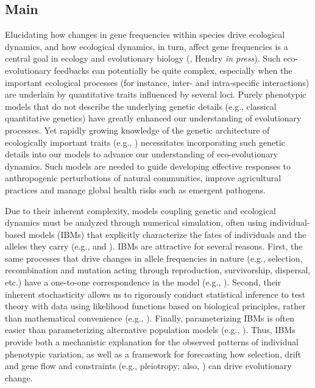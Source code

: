\documentclass[1p,numbered]{article}
\begin{document}
\begin{linenumbers}
\pagestyle{plain}



\renewcommand\linenumberfont{\normalfont\small}

\setlength\linenumbersep{1cm}
\section*{Main}
Elucidating how changes in gene frequencies within species drive ecological dynamics, and how ecological dynamics, in turn, affect gene frequencies is a central goal in ecology and evolutionary biology (\citealt{yoshida03, post09, schoener11}, Hendry \textit{in press}\nocite{hendry16}). Such eco-evolutionary feedbacks can potentially be quite complex, especially when the important ecological processes (for instance, inter- and intra-specific interactions) are underlain by quantitative traits influenced by several loci.  Purely phenotypic models that do not describe the underlying genetic details (e.g., classical quantitative genetics) have greatly enhanced our understanding of evolutionary processes. Yet rapidly growing knowledge of the genetic architecture of ecologically important traits (e.g., \citealt{stapley10, hendry13}) necessitates incorporating such genetic details into our models to advance our understanding of eco-evolutionary dynamics. Such models are needed to guide developing effective responses to anthropogenic perturbations of natural communities, improve agricultural practices and manage global health risks such as emergent pathogens.

Due to their inherent complexity, models coupling genetic and ecological dynamics must be analyzed through numerical simulation, often using individual-based models (IBMs) that explicitly characterize the fates of individuals and the alleles they carry (e.g., \citealt{deangelis05} and \citealt{carvajal10}). IBMs are attractive for several reasons. First, the same processes that drive changes in allele frequencies in nature (e.g., selection, recombination and mutation acting through reproduction, survivorship, dispersal, etc.) have a one-to-one correspondence in the model (e.g., \citealt{hoban12}). Second, their inherent stochasticity allows us to rigorously conduct statistical inference to test theory with data using likelihood functions based on biological principles, rather than mathematical convenience (e.g., \citealt{hartig11}). Finally, parameterizing IBMs is often easier than parameterizing alternative population models (e.g., \citealt{pacala96}). Thus, IBMs provide both a mechanistic explanation for the observed patterns of individual phenotypic variation, as well as a framework for forecasting how selection, drift and gene flow and constraints (e.g., pleiotropy; also, \citealt{futuyma10}) can drive evolutionary change. 


\end{linenumbers}
\end{document}
